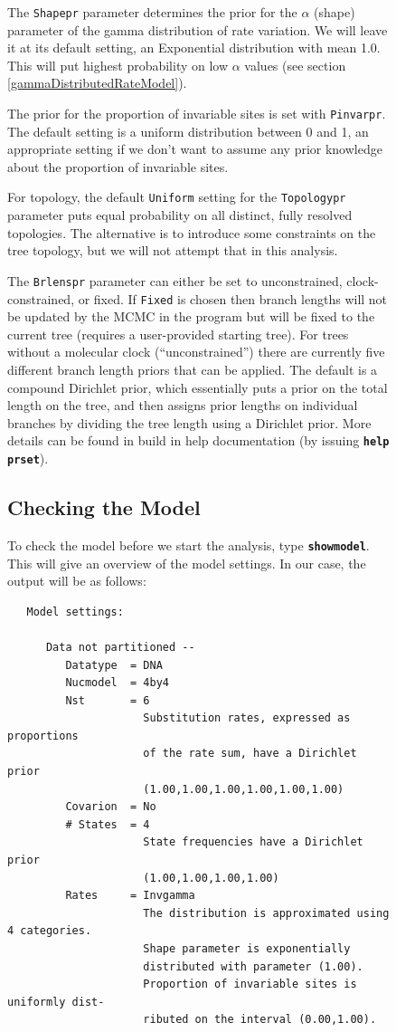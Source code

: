 \documentclass[12pt]{book}
\newcommand{\ttt}[1]{\texttt{#1}}
\newcommand{\tb}[1]{\ttt{\textbf{#1}}}
\begin{document}
\begin{figure}[h]
The \ttt{Shapepr} parameter determines the prior for the $\alpha$ (shape) parameter of the gamma
distribution of rate variation. We will leave it at its default setting, an Exponential
distribution with mean 1.0. This will put highest probability on low $\alpha$ values (see section
\ref{gammaDistributedRateModel}).

The prior for the proportion of invariable sites is set with \ttt{Pinvarpr}. The default setting
is a uniform distribution between 0 and 1, an appropriate setting if we don't want to assume any
prior knowledge about the proportion of invariable sites.

For topology, the default \ttt{Uniform} setting for the \ttt{Topologypr} parameter puts equal
probability on all distinct, fully resolved topologies. The alternative is to introduce some
constraints on the tree topology, but we will not attempt that in this analysis.

The \ttt{Brlenspr} parameter can either be set to unconstrained, clock-constrained, or fixed. If
\ttt{Fixed} is chosen then branch lengths will not be updated by the MCMC in the program but
will be fixed to the current tree (requires a user-provided starting tree).
For trees without a molecular clock (``unconstrained'') there are currently five different branch
length priors that can be applied. The default is a compound Dirichlet prior, which essentially
puts a prior on the total length on the tree, and then assigns prior lengths on individual branches
by dividing the tree length using a Dirichlet prior.
More details can be found in build in help documentation (by issuing \tb{help prset}).


\subsection{Checking the Model}

To check the model before we start the analysis, type \tb{showmodel}. This will give an
overview of the model settings. In our case, the output will be as follows:

\begin{singlespacing}
\footnotesize
\begin{verbatim}
   Model settings:

      Data not partitioned --
         Datatype  = DNA
         Nucmodel  = 4by4
         Nst       = 6
                     Substitution rates, expressed as proportions
                     of the rate sum, have a Dirichlet prior
                     (1.00,1.00,1.00,1.00,1.00,1.00)
         Covarion  = No
         # States  = 4
                     State frequencies have a Dirichlet prior
                     (1.00,1.00,1.00,1.00)
         Rates     = Invgamma
                     The distribution is approximated using 4 categories.
                     Shape parameter is exponentially
                     distributed with parameter (1.00).
                     Proportion of invariable sites is uniformly dist-
                     ributed on the interval (0.00,1.00).


\end{verbatim}
\end{singlespacing}
\end{figure}
\end{document}
